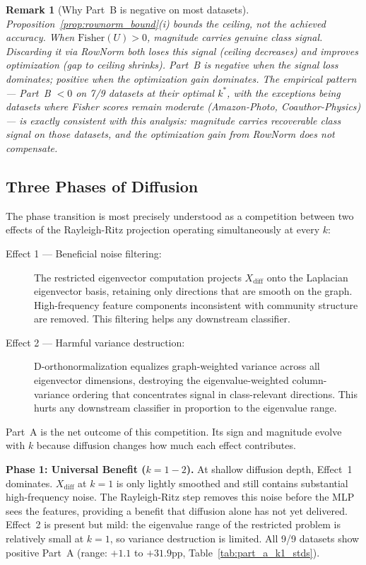 \documentclass[11pt]{article}
\newtheorem{remark}{Remark}
\begin{document}
\begin{remark}[Why Part~B is negative on most datasets]
\label{rem:partb_negative}
Proposition~\ref{prop:rownorm_bound}(i) bounds the \emph{ceiling}, not the
\emph{achieved} accuracy.
When $\mathrm{Fisher}(U) > 0$, magnitude carries genuine class signal.
Discarding it via RowNorm both loses this signal (ceiling decreases) and improves
optimization (gap to ceiling shrinks).
Part~B is negative when the signal loss dominates; positive when the optimization
gain dominates.
The empirical pattern --- Part~B $< 0$ on 7/9 datasets at their optimal $k^*$,
with the exceptions being datasets where Fisher scores remain moderate
(Amazon-Photo, Coauthor-Physics) --- is exactly consistent with this analysis:
magnitude carries recoverable class signal on those datasets, and the optimization
gain from RowNorm does not compensate.
\end{remark}

\subsection{Three Phases of Diffusion}
\label{sec:phases}

The phase transition is most precisely understood as a competition between two effects
of the Rayleigh-Ritz projection operating simultaneously at every $k$:

\begin{description}
  \item[Effect 1 — Beneficial noise filtering:]
    The restricted eigenvector computation projects $X_{\mathrm{diff}}$ onto the
    Laplacian eigenvector basis, retaining only directions that are smooth on the graph.
    High-frequency feature components inconsistent with community structure are removed.
    This filtering helps any downstream classifier.
  \item[Effect 2 — Harmful variance destruction:]
    D-orthonormalization equalizes graph-weighted variance across all eigenvector
    dimensions, destroying the eigenvalue-weighted column-variance ordering that
    concentrates signal in class-relevant directions.
    This hurts any downstream classifier in proportion to the eigenvalue range.
\end{description}

Part~A is the net outcome of this competition.  Its sign and magnitude evolve with
$k$ because diffusion changes how much each effect contributes.

\textbf{Phase 1: Universal Benefit ($k = 1{-}2$).}
At shallow diffusion depth, Effect~1 dominates.  $X_{\mathrm{diff}}$ at $k{=}1$ is
only lightly smoothed and still contains substantial high-frequency noise.
The Rayleigh-Ritz step removes this noise before the MLP sees the features, providing
a benefit that diffusion alone has not yet delivered.  Effect~2 is present but mild:
the eigenvalue range of the restricted problem is relatively small at $k{=}1$, so
variance destruction is limited.  All 9/9 datasets show positive Part~A (range:
$+1.1$ to $+31.9$pp, Table~\ref{tab:part_a_k1_stds}).
\end{document}
